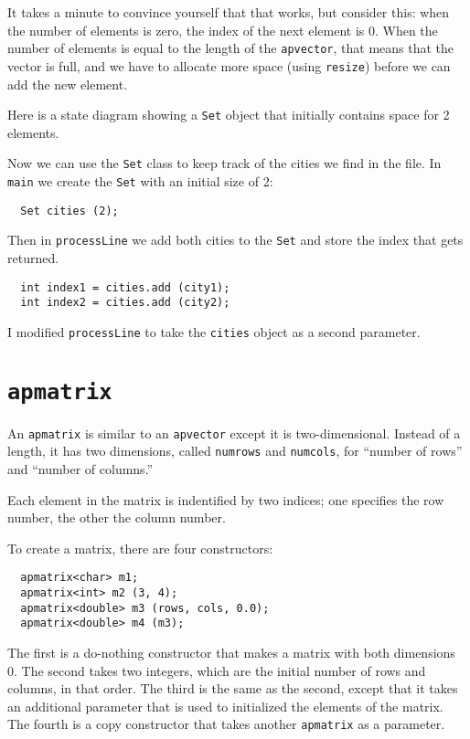 It takes a minute to convince yourself that that works, but
consider this: when the number of elements is zero, the index
of the next element is 0.  When the number of elements is
equal to the length of the {\tt apvector}, that means that the
vector is full, and we have to allocate more space (using
{\tt resize}) before we can add the new element.


Here is a state diagram showing a {\tt Set} object that
initially contains space for 2 elements.

\vspace {0.1in}
\centerline{}
\vspace {0.1in}

Now we can use the {\tt Set} class to keep track of the cities
we find in the file.  In {\tt main} we create the {\tt Set} with
an initial size of 2:

\begin{verbatim}
  Set cities (2);
\end{verbatim}
%
Then in {\tt processLine} we add both cities to the {\tt Set}
and store the index that gets returned.

\begin{verbatim}
  int index1 = cities.add (city1);
  int index2 = cities.add (city2);
\end{verbatim}
%
I modified {\tt processLine} to take the {\tt cities} object
as a second parameter.

\section {{\tt apmatrix}}

An {\tt apmatrix} is similar to an {\tt apvector} except it
is two-dimensional.  Instead of a length, it has two
dimensions, called {\tt numrows} and {\tt numcols}, for
``number of rows'' and ``number of columns.''

Each element in the matrix is indentified by two indices;
one specifies the row number, the other the column number.


To create a matrix, there are four constructors:

\begin{verbatim}
  apmatrix<char> m1;
  apmatrix<int> m2 (3, 4);
  apmatrix<double> m3 (rows, cols, 0.0);
  apmatrix<double> m4 (m3);
\end{verbatim}
%
The first is a do-nothing constructor that makes a matrix with both
dimensions 0.  The second takes two integers, which are the initial
number of rows and columns, in that order.  The third is the same as
the second, except that it takes an additional parameter that is used
to initialized the elements of the matrix.  The fourth is a copy
constructor that takes another {\tt apmatrix} as a parameter.

